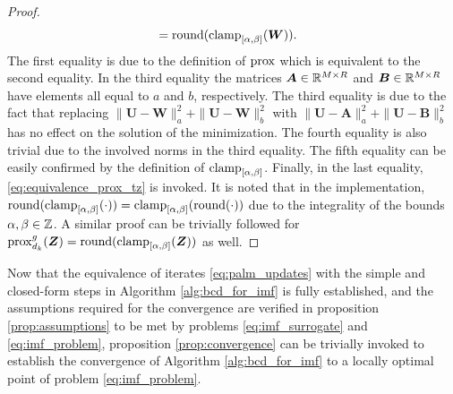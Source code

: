 \begin{proof}
\begin{align*}
                & = \operatorname{round}(\operatorname{clamp}_{[\alpha,\beta]}(\bm W)).
    \end{align*}
    The first equality is due to the definition of $\operatorname{prox}$ which is equivalent to the second equality.
    In the third equality the matrices $\bm A\in\mathbb{R}^{M\times R}$ and $\bm B\in\mathbb{R}^{M\times R}$ have elements all equal to $a$ and $b$, respectively.
    The third equality is due to the fact that replacing $\|\bm U - \bm W\|^2_a + \|\bm U - \bm W\|^2_b$ with $\|\bm U - \bm A\|^2_a + \|\bm U - \bm B\|^2_b$ has no effect on the solution of the minimization. The fourth equality is also trivial due to the involved norms in the third equality. The fifth equality can be easily confirmed by the definition of $\operatorname{clamp}_{[\alpha,\beta]}$.
    Finally, in the last equality, \eqref{eq:equivalence_prox_tz} is invoked.
    It is noted that in the implementation, $\operatorname{round}(\operatorname{clamp}_{[\alpha,\beta]}(\cdot)) = \operatorname{clamp}_{[\alpha,\beta]}(\operatorname{round}(\cdot))$ due to the integrality of the bounds $\alpha,\beta \in \mathbb{Z}$. A similar proof can be trivially followed for $\operatorname{prox}^g_{d_k}(\bm Z) = \operatorname{round}(\operatorname{clamp}_{[\alpha,\beta]}(\bm Z))$ as well.
\end{proof}
Now that the equivalence of iterates \eqref{eq:palm_updates} with the simple and closed-form steps in Algorithm \ref{alg:bcd_for_imf} is fully established, and the assumptions required for the convergence are verified in proposition \ref{prop:assumptions} to be met by problems \eqref{eq:imf_surrogate} and \eqref{eq:imf_problem}, proposition \ref{prop:convergence} can be trivially invoked to establish the convergence of Algorithm \ref{alg:bcd_for_imf} to a locally optimal point of problem \eqref{eq:imf_problem}.

